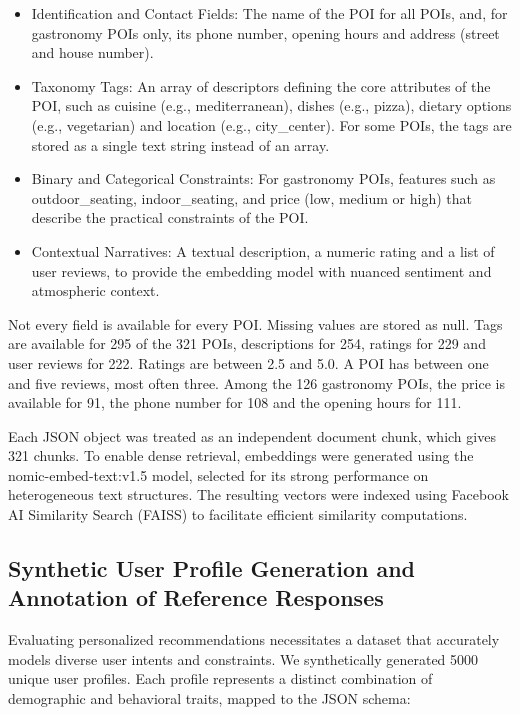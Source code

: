 \documentclass[journal,article,submit,pdftex,moreauthors]{Definitions/mdpi}
\begin{document}
\begin{itemize}[labelsep=2.5mm,topsep=-3pt]
\item Identification and Contact Fields: The name of the POI for all POIs, and, for gastronomy POIs only, its phone number, opening hours and address (street and house number).
\item Taxonomy Tags: An array of descriptors defining the core attributes of the POI, such as cuisine (e.g., mediterranean), dishes (e.g., pizza), dietary options (e.g., vegetarian) and location (e.g., city\_center). For some POIs, the tags are stored as a single text string instead of an array.
\item Binary and Categorical Constraints: For gastronomy POIs, features such as outdoor\_seating, indoor\_seating, and price (low, medium or high) that describe the practical constraints of the POI.
\item Contextual Narratives: A textual description, a numeric rating and a list of user reviews, to provide the embedding model with nuanced sentiment and atmospheric context.
\end{itemize}\vspace{3pt}

Not every field is available for every POI. Missing values are stored as null. Tags are available for 295 of the 321 POIs, descriptions for 254, ratings for 229 and user reviews for 222. Ratings are between 2.5 and 5.0. A POI has between one and five reviews, most often three. Among the 126 gastronomy POIs, the price is available for 91, the phone number for 108 and the opening hours for 111.

Each JSON object was treated as an independent document chunk, which gives 321 chunks. To enable dense retrieval, embeddings were generated using the nomic-embed-text:v1.5 model, selected for its strong performance on heterogeneous text structures. The resulting vectors were indexed using Facebook AI Similarity Search (FAISS) to facilitate efficient similarity computations.

\subsection{Synthetic User Profile Generation and Annotation of Reference Responses}
Evaluating personalized recommendations necessitates a dataset that accurately models diverse user intents and constraints. We synthetically generated 5000 unique user profiles. Each profile represents a distinct combination of demographic and behavioral traits, mapped to the JSON schema:
\end{document}
